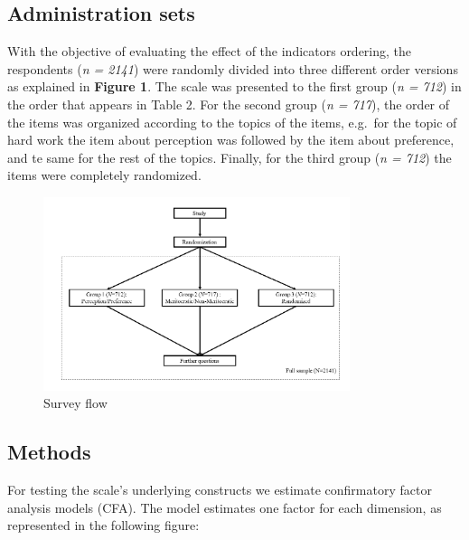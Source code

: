 \documentclass[
]{article}
\begin{document}
\pagebreak

\hypertarget{administration-sets}{%
\subsection{Administration sets}\label{administration-sets}}

With the objective of evaluating the effect of the indicators ordering,
the respondents (\emph{n = 2141}) were randomly divided into three
different order versions as explained in \textbf{Figure 1}. The scale
was presented to the first group (\emph{n = 712}) in the order that
appears in Table 2. For the second group (\emph{n = 717}), the order of
the items was organized according to the topics of the items, e.g.~for
the topic of hard work the item about perception was followed by the
item about preference, and te same for the rest of the topics. Finally,
for the third group (\emph{n = 712}) the items were completely
randomized.

\begin{figure}
\centering
\includegraphics[width=0.8\textwidth,height=\textheight]{../input/images/app_mod.png}
\caption{Survey flow}
\end{figure}

\hypertarget{methods}{%
\subsection{Methods}\label{methods}}

For testing the scale's underlying constructs we estimate confirmatory
factor analysis models (CFA). The model estimates one factor for each
dimension, as represented in the following figure:
\end{document}
